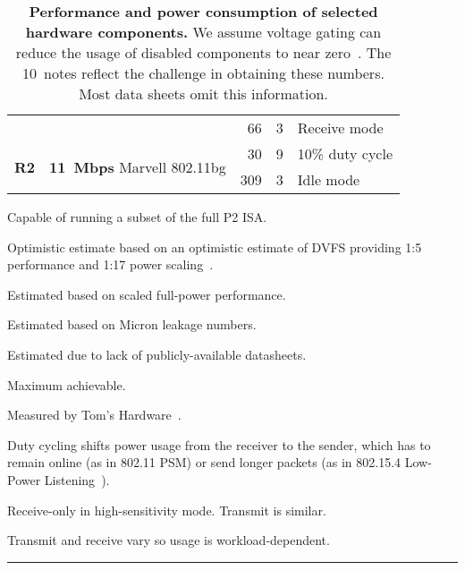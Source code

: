 \begin{table}[t]
\begin{threeparttable}
{\begin{tabularx}{\columnwidth}{p{0.05in}lr@{.}lX}
& &
66 & 3\tnote{9} &
Receive mode\tnote{9}
\\ \cmidrule(lr){2-5}

\multirow{2}{*}{\textbf{R2}} & \multirow{2}{*}{\textbf{11~Mbps} Marvell 802.11bg} &
30 & 9\tnote{3} &
10\% duty cycle\tnote{8}
\\

& &
309 & 3\tnote{10} &
Idle mode\tnote{10}
\\

\end{tabularx}
}
{\footnotesize
\begin{tablenotes}
\item [1] Capable of running a subset of the full P2 ISA.
\item [2] Optimistic estimate based on an optimistic estimate of DVFS providing 1:5 performance and
1:17 power scaling~\cite{jssc02-PowerPC-SoC}.
\item [3] Estimated based on scaled full-power performance.
\item [4] Estimated based on Micron leakage numbers.
\item [5] Estimated due to lack of publicly-available datasheets.
\item [6] Maximum achievable.
\item [7] Measured by Tom's Hardware~\cite{ssd-tomshardware}.
\item [8] Duty cycling shifts power usage from the receiver to the sender,
which has to remain online (as in 802.11 PSM) or send longer packets (as in
802.15.4 Low-Power Listening~\cite{tinyos-lpl}).
\item [9] Receive-only in high-sensitivity mode. Transmit is similar.
\item [10] Transmit and receive vary so usage is workload-dependent.
\end{tablenotes}
}
\vspace*{-0.05in}
\caption{\textbf{Performance and power consumption of selected hardware
components.} We assume voltage gating can reduce the usage of disabled
components to near zero~\cite{islped-vdd-gate}. The 10~notes reflect the
challenge in obtaining these numbers. Most data sheets omit this
information.}
\end{threeparttable}
\label{table-components}
\vspace{0.10in}
\hrule
\vspace{-0.20in}
\end{table}

